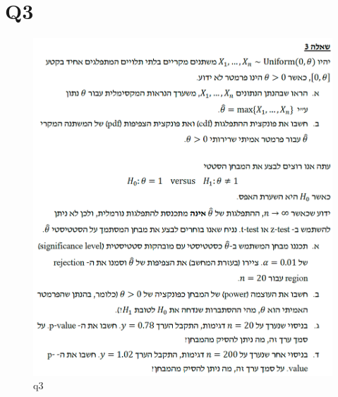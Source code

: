 
\newpage

\section{Q3}

\begin{figure}[htbp]
    \centering
    \includegraphics[width=0.65\linewidth]{images/q3.png}
    \caption{q3}
    \label{fig:enter-label}
\end{figure}